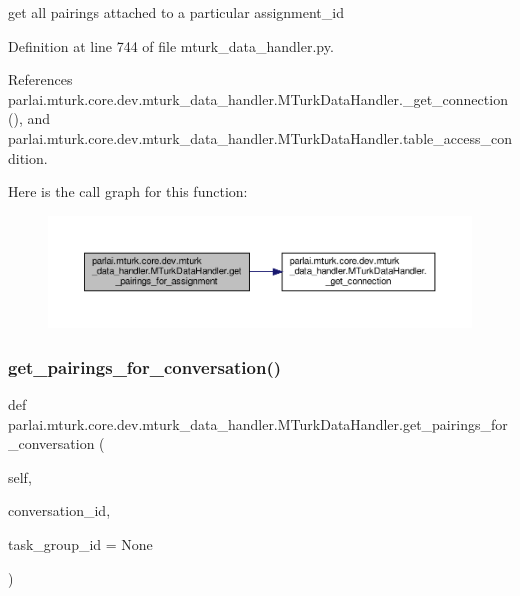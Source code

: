 \begin{DoxyVerb}get all pairings attached to a particular assignment_id\end{DoxyVerb}
 

Definition at line 744 of file mturk\+\_\+data\+\_\+handler.\+py.



References parlai.\+mturk.\+core.\+dev.\+mturk\+\_\+data\+\_\+handler.\+M\+Turk\+Data\+Handler.\+\_\+get\+\_\+connection(), and parlai.\+mturk.\+core.\+dev.\+mturk\+\_\+data\+\_\+handler.\+M\+Turk\+Data\+Handler.\+table\+\_\+access\+\_\+condition.

Here is the call graph for this function\+:
\nopagebreak
\begin{figure}[H]
\begin{center}
\leavevmode
\includegraphics[width=350pt]{classparlai_1_1mturk_1_1core_1_1dev_1_1mturk__data__handler_1_1MTurkDataHandler_a112a75abc2ccd02aa53119c88d1c6bb2_cgraph}
\end{center}
\end{figure}
\mbox{\label{classparlai_1_1mturk_1_1core_1_1dev_1_1mturk__data__handler_1_1MTurkDataHandler_a507259114132bb247683c7f9b127c12c}} 
\subsubsection{\texorpdfstring{get\+\_\+pairings\+\_\+for\+\_\+conversation()}{get\_pairings\_for\_conversation()}}
{\footnotesize\ttfamily def parlai.\+mturk.\+core.\+dev.\+mturk\+\_\+data\+\_\+handler.\+M\+Turk\+Data\+Handler.\+get\+\_\+pairings\+\_\+for\+\_\+conversation (\begin{DoxyParamCaption}\item[{}]{self,  }\item[{}]{conversation\+\_\+id,  }\item[{}]{task\+\_\+group\+\_\+id = {\ttfamily None} }\end{DoxyParamCaption})}

